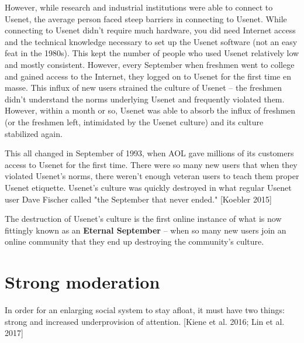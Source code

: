 \documentclass[class=book, crop=false]{standalone}
\providecommand{\keyterm}[1]{\textbf{#1}\marginnote{\scriptsize \textbf{#1}}}
\begin{document}
However, while research and industrial institutions were able to connect to Usenet, the average person faced steep barriers in connecting to Usenet. While connecting to Usenet didn't require much hardware, you did need Internet access and the technical knowledge necessary to set up the Usenet software (not an easy feat in the 1980s). This kept the number of people who used Usenet relatively low and mostly consistent. However, every September when freshmen went to college and gained access to the Internet, they logged on to Usenet for the first time en masse. This influx of new users strained the culture of Usenet -- the freshmen didn't understand the norms underlying Usenet and frequently violated them. However, within a month or so, Usenet was able to absorb the influx of freshmen (or the freshmen left, intimidated by the Usenet culture) and its culture stabilized again.

This all changed in September of 1993, when AOL gave millions of its customers access to Usenet for the first time. There were so many new users that when they violated Usenet's norms, there weren't enough veteran users to teach them proper Usenet etiquette. Usenet's culture was quickly destroyed in what regular Usenet user Dave Fischer called "the September that never ended." [Koebler 2015]

The destruction of Usenet's culture is the first online instance of what is now fittingly known as an \keyterm{Eternal September} -- when so many new users join an online community that they end up destroying the community's culture.

\section{Strong moderation}

In order for an enlarging social system to stay afloat, it must have two things: strong  and increased underprovision of attention. [Kiene et al. 2016; Lin et al. 2017]\\
\end{document}
